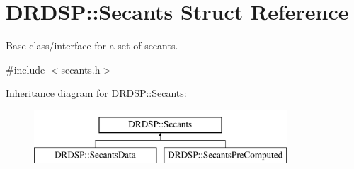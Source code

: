 \hypertarget{struct_d_r_d_s_p_1_1_secants}{\section{D\-R\-D\-S\-P\-:\-:Secants Struct Reference}
\label{struct_d_r_d_s_p_1_1_secants}
}


Base class/interface for a set of secants.  




{\ttfamily \#include $<$secants.\-h$>$}

Inheritance diagram for D\-R\-D\-S\-P\-:\-:Secants\-:\begin{figure}[H]
\begin{center}
\leavevmode
\includegraphics[height=2.000000cm]{struct_d_r_d_s_p_1_1_secants}
\end{center}
\end{figure}
